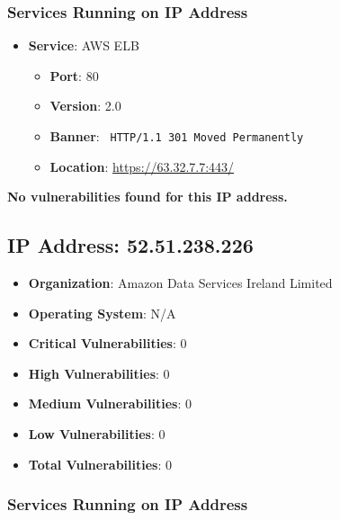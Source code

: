 \documentclass{article}
\begin{document}
\subsubsection*{Services Running on IP Address}

\begin{itemize}
    
        \item \textbf{Service}: AWS ELB
        \begin{itemize}
            \item \textbf{Port}: 80
            \item \textbf{Version}:  2.0 
            \item \textbf{Banner}: \texttt{
                HTTP/1.1 301 Moved Permanently
            }
            \item \textbf{Location}: \href{ https://63.32.7.7:443/ }{ https://63.32.7.7:443/ }
        \end{itemize}
    
\end{itemize}


\textbf{No vulnerabilities found for this IP address.}




\clearpage



\subsection*{IP Address: 52.51.238.226}

\begin{itemize}
    \item \textbf{Organization}: Amazon Data Services Ireland Limited
    \item \textbf{Operating System}:  N/A 
    \item \textbf{Critical Vulnerabilities}: 0
    \item \textbf{High Vulnerabilities}: 0
    \item \textbf{Medium Vulnerabilities}: 0
    \item \textbf{Low Vulnerabilities}: 0
    \item \textbf{Total Vulnerabilities}: 0
\end{itemize}

\subsubsection*{Services Running on IP Address}
\end{document}
